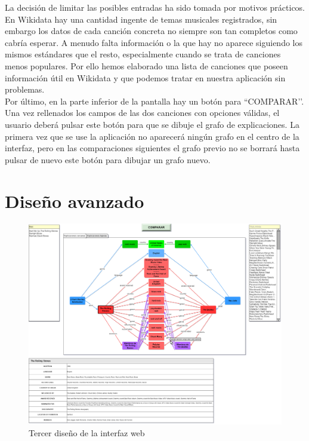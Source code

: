 La decisión de limitar las posibles entradas ha sido tomada por motivos prácticos. En Wikidata hay una cantidad ingente de temas musicales registrados, sin embargo los datos de cada canción concreta no siempre son tan completos como cabría esperar. A menudo falta información o la que hay no aparece siguiendo los mismos estándares que el resto, especialmente cuando se trata de canciones menos populares. Por ello hemos elaborado una lista de canciones que poseen información útil en Wikidata y que podemos tratar en nuestra aplicación sin problemas.\\

Por último, en la parte inferior de la pantalla hay un botón para ``COMPARAR’’. Una vez rellenados los campos de las dos canciones con opciones válidas, el usuario deberá pulsar este botón para que se dibuje el grafo de explicaciones. La primera vez que se use la aplicación no aparecerá ningún grafo en el centro de la interfaz, pero en las comparaciones siguientes el grafo previo no se borrará hasta pulsar de nuevo este botón para dibujar un grafo nuevo.\\

\section{Diseño avanzado}

\begin{figure}[h!]
	\centering
	\includegraphics[width = 1\textwidth]{Imagenes/Bitmap/Tercera Interfaz.png}
	\caption{Tercer diseño de la interfaz web}
	\label{fig:tercerDiseño}
\end{figure}

